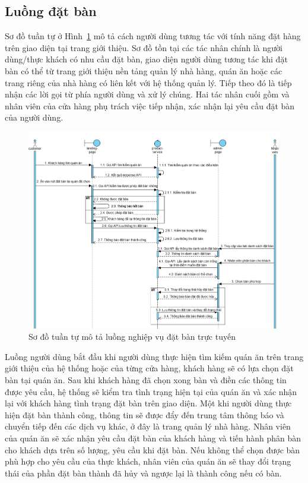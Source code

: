 \subsection{Luồng đặt bàn}\label{sec:reservation-sequence-flow}
Sơ đồ tuần tự ở Hình~\ref{fig:reservation-sequence-flow} mô tả cách người dùng tương tác với tính năng đặt hàng trên giao diện tại trang giới thiệu.
Sơ đồ tồn tại các tác nhân chính là người dùng/thực khách có nhu cầu đặt bàn, giao diện người dùng tương tác khi đặt bàn có thể từ trang giới thiệu nền tảng quản lý nhà hàng, quán ăn hoặc các trang riêng của nhà hàng có liên kết với hệ thống quản lý.
Tiếp theo đó là  tiếp nhận các lời gọi từ phía người dùng và xử lý chúng.
Hai tác nhân cuối gồm  và nhân viên của cửa hàng phụ trách việc tiếp nhận, xác nhận lại yêu cầu đặt bàn của người dùng.

\begin{figure}[h]
	\centering
	\includegraphics[width=\textwidth]{images/hChip/main-flow/reservation.png}
	\caption{Sơ đồ tuần tự mô tả luồng nghiệp vụ đặt bàn trực tuyến}
	\label{fig:reservation-sequence-flow}
\end{figure}

Luồng người dùng bắt đầu khi người dùng thực hiện tìm kiếm quán ăn trên trang giới thiệu của hệ thống hoặc của từng cửa hàng, khách hàng sẽ có lựa chọn đặt bàn tại quán ăn.
Sau khi khách hàng đã chọn xong bàn và điền các thông tin được yêu cầu, hệ thống sẽ kiểm tra tình trạng hiện tại của quán ăn và xác nhận lại với khách hàng tình trạng đặt bàn trên giao diện.
Một khi người dùng thực hiện đặt bàn thành công, thông tin sẽ được đẩy đến trung tâm thông báo và chuyển tiếp đến các dịch vụ khác, ở đây là trang quản lý nhà hàng. 
Nhân viên của quán ăn sẽ xác nhận yêu cầu đặt bàn của khách hàng và tiến hành phân bàn cho khách dựa trên số lượng, yêu cầu khi đặt bàn.
Nếu không thể chọn được bàn phù hợp cho yêu cầu của thực khách, nhân viên của quán ăn sẽ thay đổi trạng thái của phần đặt bàn thành đã hủy và ngược lại là thành công nếu có bàn.

